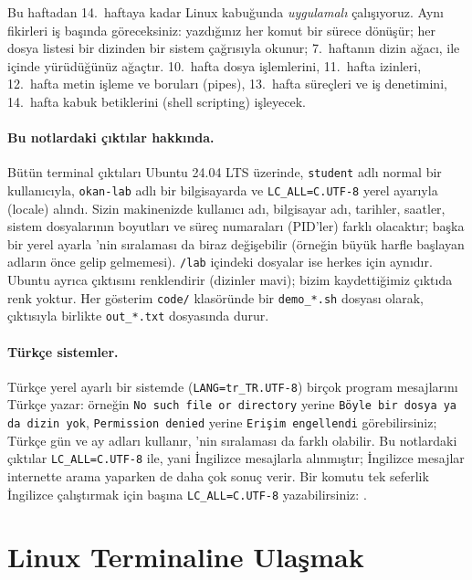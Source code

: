Bu haftadan 14.\ haftaya kadar Linux kabuğunda \emph{uygulamalı} çalışıyoruz. Aynı fikirleri iş başında göreceksiniz: yazdığınız her komut bir sürece dönüşür; her dosya listesi bir dizinden bir sistem çağrısıyla okunur; 7.\ haftanın dizin ağacı,  ile içinde yürüdüğünüz ağaçtır. 10.\ hafta dosya işlemlerini, 11.\ hafta izinleri, 12.\ hafta metin işleme ve boruları (pipes), 13.\ hafta süreçleri ve iş denetimini, 14.\ hafta kabuk betiklerini (shell scripting) işleyecek.

\paragraph{Bu notlardaki çıktılar hakkında.} Bütün terminal çıktıları Ubuntu 24.04 LTS üzerinde, \texttt{student} adlı normal bir kullanıcıyla, \texttt{okan-lab} adlı bir bilgisayarda ve \texttt{LC\_ALL=C.UTF-8} yerel ayarıyla (locale) alındı. Sizin makinenizde kullanıcı adı, bilgisayar adı, tarihler, saatler, sistem dosyalarının boyutları ve süreç numaraları (PID'ler) farklı olacaktır; başka bir yerel ayarla 'nin sıralaması da biraz değişebilir (örneğin büyük harfle başlayan adların önce gelip gelmemesi). \texttt{\tl/lab} içindeki dosyalar ise herkes için aynıdır. Ubuntu ayrıca  çıktısını renklendirir (dizinler mavi); bizim kaydettiğimiz çıktıda renk yoktur. Her gösterim \texttt{code/} klasöründe bir \texttt{demo\_*.sh} dosyası olarak, çıktısıyla birlikte \texttt{out\_*.txt} dosyasında durur.

\paragraph{Türkçe sistemler.} Türkçe yerel ayarlı bir sistemde (\texttt{LANG=tr\_TR.UTF-8}) birçok program mesajlarını Türkçe yazar: örneğin \texttt{No such file or directory} yerine \texttt{Böyle bir dosya ya da dizin yok}, \texttt{Permission denied} yerine \texttt{Erişim engellendi} görebilirsiniz;  Türkçe gün ve ay adları kullanır, 'nin sıralaması da farklı olabilir. Bu notlardaki çıktılar \texttt{LC\_ALL=C.UTF-8} ile, yani İngilizce mesajlarla alınmıştır; İngilizce mesajlar internette arama yaparken de daha çok sonuç verir. Bir komutu tek seferlik İngilizce çalıştırmak için başına \texttt{LC\_ALL=C.UTF-8} yazabilirsiniz: .

\section{Linux Terminaline Ulaşmak}
\label{sec:getlinux}

